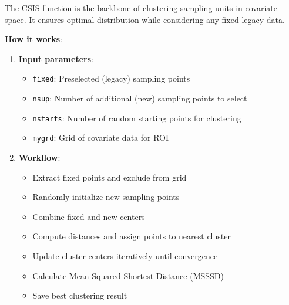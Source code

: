 \documentclass[
  10pt,
  b5paper,
  oneside]{book}
\providecommand{\tightlist}{%
  \setlength{\itemsep}{0pt}\setlength{\parskip}{0pt}}
\begin{document}
The CSIS function is the backbone of clustering sampling units in covariate space. It ensures optimal distribution while considering any fixed legacy data.

\textbf{How it works}:

\begin{enumerate}
\def\labelenumi{\arabic{enumi}.}
\tightlist
\item
  \textbf{Input parameters}:

  \begin{itemize}
  \tightlist
  \item
    \texttt{fixed}: Preselected (legacy) sampling points
  \item
    \texttt{nsup}: Number of additional (new) sampling points to select
  \item
    \texttt{nstarts}: Number of random starting points for clustering
  \item
    \texttt{mygrd}: Grid of covariate data for ROI
  \end{itemize}
\item
  \textbf{Workflow}:

  \begin{itemize}
  \tightlist
  \item
    Extract fixed points and exclude from grid
  \item
    Randomly initialize new sampling points
  \item
    Combine fixed and new centers
  \item
    Compute distances and assign points to nearest cluster
  \item
    Update cluster centers iteratively until convergence
  \item
    Calculate Mean Squared Shortest Distance (MSSSD)
  \item
    Save best clustering result
  \end{itemize}
\end{enumerate}
\end{document}
